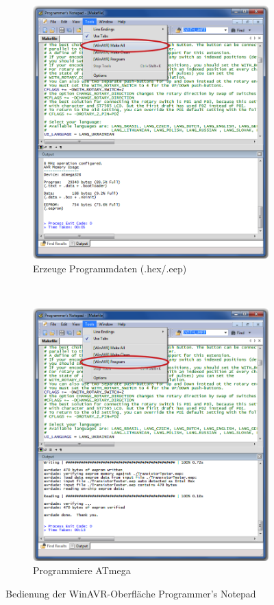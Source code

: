 \begin{figure}[H]
  \begin{subfigure}[b]{.5\textwidth}
    \centering
    \includegraphics[width=.85\textwidth]{../PNG/Notepad_make.png}
    \caption{Erzeuge Programmdaten (.hex/.eep)}
  \end{subfigure}
  ~
  \begin{subfigure}[b]{.5\textwidth}
    \centering
    \includegraphics[width=.85\textwidth]{../PNG/Notepad_program.png}
    \caption{Programmiere ATmega}
  \end{subfigure}
  \caption{Bedienung der WinAVR-Oberfläche Programmer's Notepad}
  \label{fig:WinAVR2}
\end{figure}

